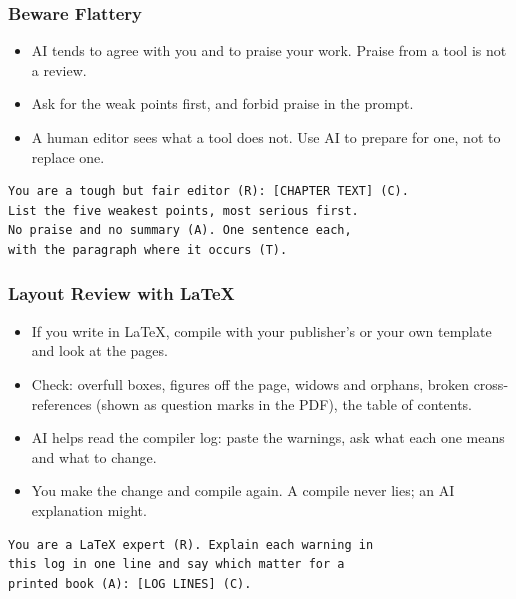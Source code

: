 \begin{frame}[fragile]\frametitle{Beware Flattery}
\begin{itemize}
\item AI tends to agree with you and to praise your work. Praise from a tool is not a review.
\item Ask for the weak points first, and forbid praise in the prompt.
\item A human editor sees what a tool does not. Use AI to prepare for one, not to replace one.
\end{itemize}
\begin{lstlisting}[language=HTML]
You are a tough but fair editor (R): [CHAPTER TEXT] (C).
List the five weakest points, most serious first.
No praise and no summary (A). One sentence each,
with the paragraph where it occurs (T).
\end{lstlisting}
\end{frame}

\begin{frame}[fragile]\frametitle{Layout Review with LaTeX}
\begin{itemize}
\item If you write in LaTeX, compile with your publisher's or your own template and look at the pages.
\item Check: overfull boxes, figures off the page, widows and orphans, broken cross-references (shown as question marks in the PDF), the table of contents.
\item AI helps read the compiler log: paste the warnings, ask what each one means and what to change.
\item You make the change and compile again. A compile never lies; an AI explanation might.
\end{itemize}
\begin{lstlisting}[language=HTML]
You are a LaTeX expert (R). Explain each warning in
this log in one line and say which matter for a
printed book (A): [LOG LINES] (C).
\end{lstlisting}
\end{frame}

